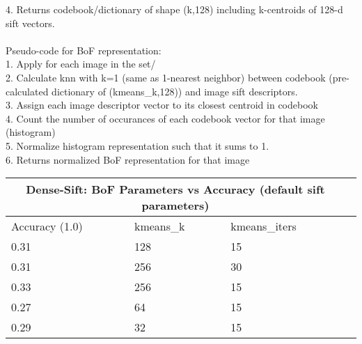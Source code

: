 \documentclass[12pt]{article}
\begin{document}
\begin{center}
        4. Returns codebook/dictionary of shape (k,128) including k-centroids of 128-d sift vectors.
        \\~\\
        Pseudo-code for BoF representation: \\
        1. Apply for each image in the set/ \\
        2. Calculate knn with k=1 (same as 1-nearest neighbor) between codebook (pre-calculated dictionary of (kmeans\_k,128)) and image sift descriptors. \\
        3. Assign each image descriptor vector to its closest centroid in codebook \\
        4. Count the number of occurances of each codebook vector for that image (histogram) \\
        5. Normalize histogram representation such that it sums to 1. \\
        6. Returns normalized BoF representation for that image
    \end{center}

    \vspace*{0.5cm}
        \begin{tabular}{ |p{1.5cm}||p{3cm}|p{3cm}|p{3cm}| }
            \hline
            \multicolumn{3}{|c|}{Dense-Sift: BoF Parameters vs Accuracy (default sift parameters)} \\
            \hline
            Accuracy (1.0)  & kmeans\_k & kmeans\_iters\\
            \hline
            0.31 & 128 & 15 \\ %
            \hline
            0.31 & 256 & 30 \\
            \hline
            0.33 & 256 & 15 \\
            \hline
            0.27 & 64 & 15 \\
            \hline
            0.29 & 32 & 15 \\
            \hline
        \end{tabular}
       
\end{document}
